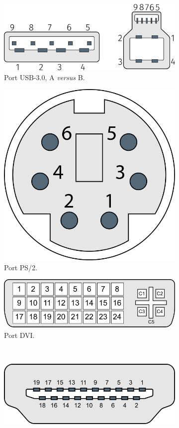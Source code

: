 \begin{figure}[!hb]
	\begin{subfigure}[b]{0.35\linewidth}\Centering
		\includegraphics[width=0.9\linewidth]{./Images/Chapter01/figI-01a-usb3.png}
		\caption{\label{fig:I.1a}Port USB-3.0, A \emph{versus} B.}
	\end{subfigure}\hfill
	\begin{subfigure}[b]{0.3\linewidth}\Centering
		\includegraphics[width=0.40\linewidth]{./Images/Chapter01/figI-01b-ps2.png}
		\caption{\label{fig:I.1b}Port PS/2.}
	\end{subfigure}\hfill
	\begin{subfigure}[b]{0.3\linewidth}\Centering
		\includegraphics[width=0.70\linewidth]{./Images/Chapter01/figI-01c-dvi.png}
		\caption{\label{fig:I.1c}Port DVI.}
	\end{subfigure}\\[8pt]
	\begin{subfigure}[b]{0.35\linewidth}\Centering
		\includegraphics[width=0.65\linewidth]{./Images/Chapter01/figI-01d-hdmi.png}

\end{subfigure}
\end{figure}
